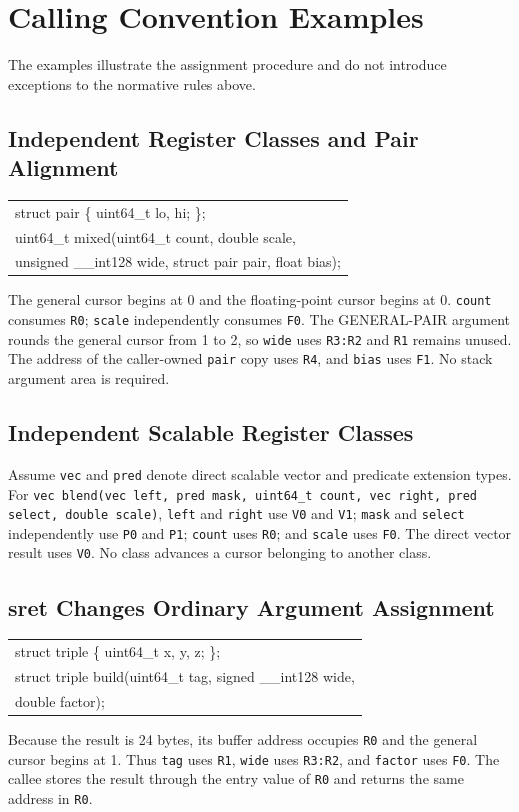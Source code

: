 \documentclass[10pt,twoside]{article}
\begin{document}
\clearpage
\section{Calling Convention Examples}\label{page:calling-convention-examples}
The examples illustrate the assignment procedure and do not introduce
exceptions to the normative rules above.

\subsection{Independent Register Classes and Pair Alignment}
\begingroup\small\ttfamily
\begin{tabularx}{\linewidth}{@{}X@{}}
struct pair \{ uint64\_t lo, hi; \};\tabularnewline
uint64\_t mixed(uint64\_t count, double scale,\tabularnewline
\hspace{1.2em}unsigned \_\_int128 wide, struct pair pair, float bias);\tabularnewline
\end{tabularx}
\endgroup
The general cursor begins at 0 and the floating-point cursor begins at 0.
\texttt{count} consumes \texttt{R0}; \texttt{scale} independently consumes
\texttt{F0}. The GENERAL-PAIR argument rounds the general cursor from 1 to 2,
so \texttt{wide} uses \texttt{R3:R2} and \texttt{R1} remains unused. The
address of the caller-owned \texttt{pair} copy uses \texttt{R4}, and
\texttt{bias} uses \texttt{F1}. No stack argument area is required.

\subsection{Independent Scalable Register Classes}
Assume \texttt{vec} and \texttt{pred} denote direct scalable vector and
predicate extension types. For
\texttt{vec blend(vec left, pred mask, uint64\_t count, vec right, pred
select, double scale)}, \texttt{left} and \texttt{right} use \texttt{V0} and
\texttt{V1}; \texttt{mask} and \texttt{select} independently use \texttt{P0}
and \texttt{P1}; \texttt{count} uses \texttt{R0}; and \texttt{scale} uses
\texttt{F0}. The direct vector result uses \texttt{V0}. No class advances a
cursor belonging to another class.

\subsection{sret Changes Ordinary Argument Assignment}
\begingroup\small\ttfamily
\begin{tabularx}{\linewidth}{@{}X@{}}
struct triple \{ uint64\_t x, y, z; \};\tabularnewline
struct triple build(uint64\_t tag, signed \_\_int128 wide,\tabularnewline
\hspace{1.2em}double factor);\tabularnewline
\end{tabularx}
\endgroup
Because the result is 24 bytes, its buffer address occupies \texttt{R0} and
the general cursor begins at 1. Thus \texttt{tag} uses \texttt{R1},
\texttt{wide} uses \texttt{R3:R2}, and \texttt{factor} uses \texttt{F0}.
The callee stores the result through the entry value of \texttt{R0} and returns
the same address in \texttt{R0}.
\end{document}
